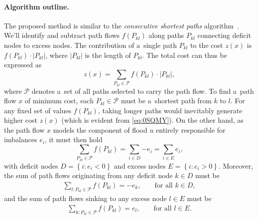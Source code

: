 \documentclass[paper=a4,parskip=half,DIV=12]{leetcode}
\begin{document}
\paragraph{Algorithm outline.}
The proposed method is similar to the {\em consecutive shortest paths}
algorithm~\cite{ahuja1993network}. We'll identify and subtract path flows
$f(P_{kl})$ along paths $P_{kl}$ connecting deficit nodes to excess nodes.
The contribution of a~single path $P_{kl}$ to the cost $z(x)$ is $f(P_{kl})
\cdot |P_{kl}|$, where $|P_{kl}|$ is the length of $P_{kl}$. The total cost can
thus be expressed as
\begin{equation}
  z(x) = \sum_{P_{kl} \in \mathcal{P}}{f(P_{kl}) \cdot |P_{kl}|},
  \label{eq:0SQMY}
\end{equation}
where $\mathcal{P}$ denotes a~set of all paths selected to carry the path flow.
To find a~path flow $x$ of minimum cost, each $P_{kl} \in \mathcal{P}$ must be
a~shortest path from $k$ to $l$. For any fixed set of values $f(P_{kl})$,
taking longer paths would inevitably generate higher cost $z(x)$ (which is
evident from \eqref{eq:0SQMY}). On the other hand, as the path flow $x$ models
the component of flood $u$ entirely responsible for imbalances $e_i$, it must
then hold
\begin{equation}
  \sum_{P_{kl} \in \mathcal{P}}{f(P_{kl})} = \sum_{i \in D}{-e_i} = \sum_{i \in E}{e_i},
  \label{eq:QDPFI}
\end{equation}
with deficit nodes $D = \left\lbrace i: e_i < 0\right\rbrace$ and excess nodes
$E = \left\lbrace i: e_i > 0\right\rbrace$. Moreover, the sum of path flows
originating from any deficit node $k \in D$ must be
\begin{equation}
  \begin{aligned}
    & \sum_{l: P_{kl} \in \mathcal{P}}{f(P_{kl})} = -e_k, && \text{ for all } k \in D, &
  \end{aligned}
  \label{eq:I9S7G}
\end{equation}
and the sum of path flows sinking to any excess node $l \in E$ must be
\begin{equation}
  \begin{aligned}
    & \sum_{k: P_{kl} \in \mathcal{P}}{f(P_{kl})} = e_l, && \text{ for all } l \in E. &
  \end{aligned}
  \label{eq:MW3RR}
\end{equation}
\end{document}
